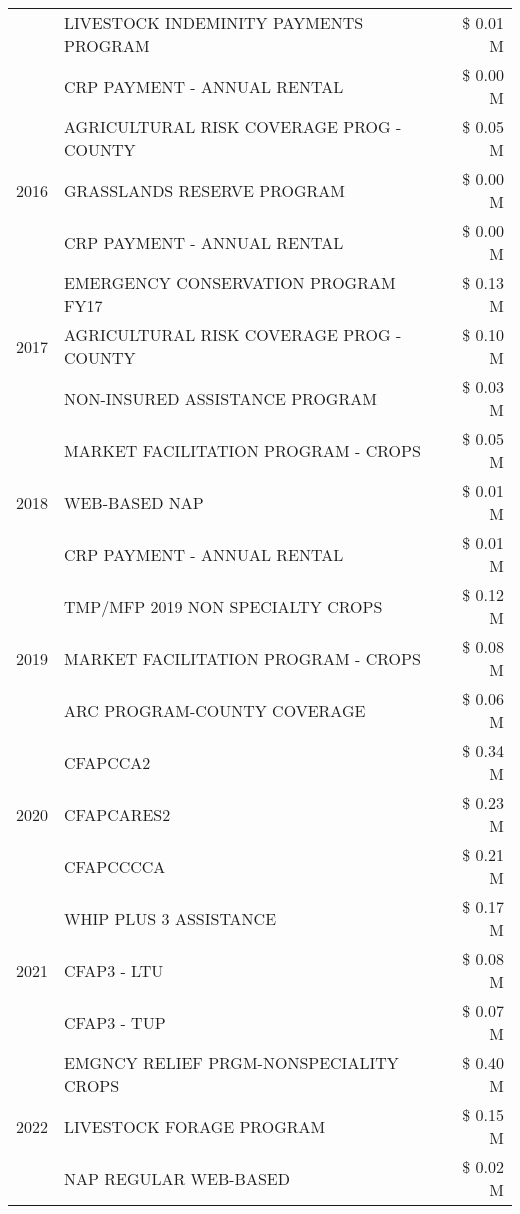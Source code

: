 \begin{tabular}{llr}
 & LIVESTOCK INDEMINITY PAYMENTS PROGRAM & \$ 0.01 M \\
 & CRP PAYMENT - ANNUAL RENTAL & \$ 0.00 M \\
\cline{1-3}
\multirow[t]{3}{*}{2016} & AGRICULTURAL RISK COVERAGE PROG - COUNTY & \$ 0.05 M \\
 & GRASSLANDS RESERVE PROGRAM & \$ 0.00 M \\
 & CRP PAYMENT - ANNUAL RENTAL & \$ 0.00 M \\
\cline{1-3}
\multirow[t]{3}{*}{2017} & EMERGENCY CONSERVATION PROGRAM FY17 & \$ 0.13 M \\
 & AGRICULTURAL RISK COVERAGE PROG - COUNTY & \$ 0.10 M \\
 & NON-INSURED ASSISTANCE PROGRAM & \$ 0.03 M \\
\cline{1-3}
\multirow[t]{3}{*}{2018} & MARKET FACILITATION PROGRAM - CROPS & \$ 0.05 M \\
 & WEB-BASED NAP & \$ 0.01 M \\
 & CRP PAYMENT - ANNUAL RENTAL & \$ 0.01 M \\
\cline{1-3}
\multirow[t]{3}{*}{2019} & TMP/MFP 2019 NON SPECIALTY CROPS & \$ 0.12 M \\
 & MARKET FACILITATION PROGRAM - CROPS & \$ 0.08 M \\
 & ARC PROGRAM-COUNTY COVERAGE & \$ 0.06 M \\
\cline{1-3}
\multirow[t]{3}{*}{2020} & CFAPCCA2 & \$ 0.34 M \\
 & CFAPCARES2 & \$ 0.23 M \\
 & CFAPCCCCA & \$ 0.21 M \\
\cline{1-3}
\multirow[t]{3}{*}{2021} & WHIP PLUS 3 ASSISTANCE & \$ 0.17 M \\
 & CFAP3 - LTU & \$ 0.08 M \\
 & CFAP3 - TUP & \$ 0.07 M \\
\cline{1-3}
\multirow[t]{3}{*}{2022} & EMGNCY RELIEF PRGM-NONSPECIALITY CROPS & \$ 0.40 M \\
 & LIVESTOCK FORAGE PROGRAM & \$ 0.15 M \\
 & NAP REGULAR WEB-BASED & \$ 0.02 M \\
\cline{1-3}
\bottomrule
\end{tabular}
